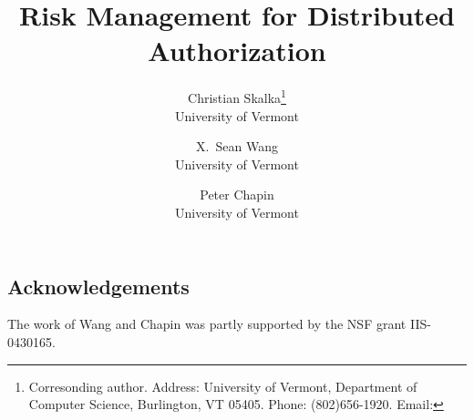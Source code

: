 \documentclass{article}
\title{Risk Management for Distributed Authorization}
\author{
Christian Skalka\footnote{Corresonding author. 
Address: University of 
Vermont, Department of Computer Science, Burlington, VT 05405.
Phone: (802)656-1920.  Email: \ttt{skalka@cs.uvm.edu}}  \\ University of Vermont
\and 
X.~Sean Wang  \\ University of Vermont
\and 
Peter Chapin \\ University of Vermont
}
\date{}
\begin{document}
\maketitle



















\subsection*{Acknowledgements}
The work of Wang and Chapin was partly supported by the NSF grant
IIS-0430165.





\end{document}
